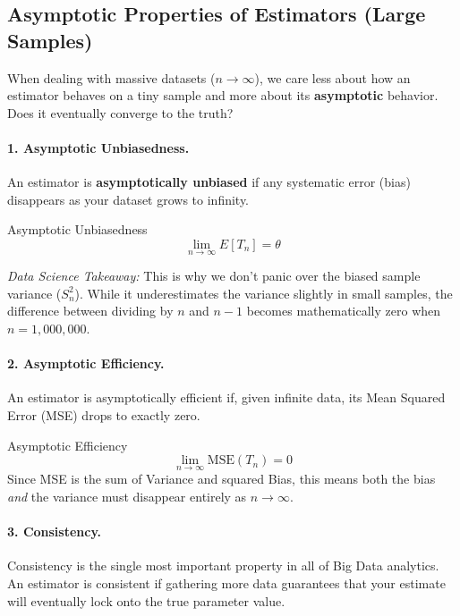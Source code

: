 \documentclass[11pt]{article}
\theoremstyle{smallexample}
\begin{document}
\subsection{Asymptotic Properties of Estimators (Large Samples)}

When dealing with massive datasets ($n \to \infty$), we care less about how an estimator behaves on a tiny sample and more about its \textbf{asymptotic} behavior. Does it eventually converge to the truth?

\vspace{-0.2cm}
\paragraph*{1. Asymptotic Unbiasedness.}
An estimator is \textbf{asymptotically unbiased} if any systematic error (bias) disappears as your dataset grows to infinity.

\begin{defbox}{Asymptotic Unbiasedness}
\begin{equation}
\lim_{n \to \infty} E[T_n] = \theta
\end{equation}
\end{defbox}

\textit{Data Science Takeaway:} This is why we don't panic over the biased sample variance ($S_n^2$). While it underestimates the variance slightly in small samples, the difference between dividing by $n$ and $n-1$ becomes mathematically zero when $n = 1,000,000$. 


\vspace{-0.2cm}
\paragraph*{2. Asymptotic Efficiency.}
An estimator is asymptotically efficient if, given infinite data, its Mean Squared Error (MSE) drops to exactly zero. 

\begin{defbox}{Asymptotic Efficiency}
\[ \lim_{n \to \infty} \text{MSE}(T_n) = 0 \]
Since MSE is the sum of Variance and squared Bias, this means both the bias \textit{and} the variance must disappear entirely as $n \to \infty$.
\end{defbox}


\vspace{-0.2cm}
\paragraph*{3. Consistency.}
Consistency is the single most important property in all of Big Data analytics. An estimator is consistent if gathering more data guarantees that your estimate will eventually lock onto the true parameter value.
\end{document}
